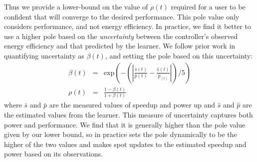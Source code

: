 Thus we provide a lower-bound on the value of $\rho(t)$ required for a
user to be confident that \SYSTEM{} will converge to the desired
performance.  This pole value only considers performance, and not
energy efficiency.  In practice, we find it better to use a higher
pole based on the \emph{uncertainty} between the controller's observed
energy efficiency and that predicted by the learner.  We follow prior
work \cite{Tokic2010} in quantifying uncertainty as $\beta(t)$, and
setting the pole based on this uncertainty:
\begin{equation}
  \begin{array}{rcl}
    \beta(t) &=&  \text{exp}{\left(- \left( \left|   \frac{\bar{s}(t)}{\bar{p}(t)}  -\frac{ \hat{s}(t)}{\hat{p}_(t)} \right| \right) /5\right)} \\
    \rho(t) &=& \frac{1-\beta(t)}{1+\beta(t)} 
  \end{array}
  \label{eqn:uncer}
\end{equation}
where $\bar{s}$ and $\bar{p}$ are the measured values of speedup and
power up and $\hat{s}$ and $\hat{p}$ are the estimated values from the
learner.  This measure of uncertainty captures both power and
performance.  We find that it is generally higher than the pole value
given by our lower bound, so in practice \SYSTEM{} sets the pole
dynamically to be the higher of the two values and \SYSTEM{} makes
spot updates to the estimated speedup and power based on its
observations.

